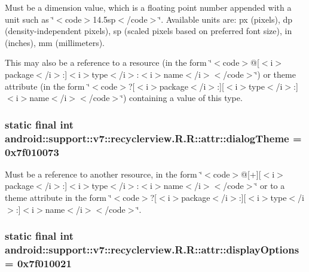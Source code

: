 Must be a dimension value, which is a floating point number appended with a unit such as \char`\"{}$<$code$>$14.5sp$<$/code$>$\char`\"{}. Available units are: px (pixels), dp (density-independent pixels), sp (scaled pixels based on preferred font size), in (inches), mm (millimeters). 

This may also be a reference to a resource (in the form \char`\"{}$<$code$>$@\mbox{[}$<$i$>$package$<$/i$>$:\mbox{]}$<$i$>$type$<$/i$>$:$<$i$>$name$<$/i$>$$<$/code$>$\char`\"{}) or theme attribute (in the form \char`\"{}$<$code$>$?\mbox{[}$<$i$>$package$<$/i$>$:\mbox{]}\mbox{[}$<$i$>$type$<$/i$>$:\mbox{]}$<$i$>$name$<$/i$>$$<$/code$>$\char`\"{}) containing a value of this type. \hypertarget{classandroid_1_1support_1_1v7_1_1recyclerview_1_1_r_1_1attr_dd7453cd22d8945f17812a8cf3ff4993}{
\subsubsection[{dialogTheme}]{\setlength{\rightskip}{0pt plus 5cm}static final int android::support::v7::recyclerview.R.R::attr::dialogTheme = 0x7f010073}}
\label{classandroid_1_1support_1_1v7_1_1recyclerview_1_1_r_1_1attr_dd7453cd22d8945f17812a8cf3ff4993}


Must be a reference to another resource, in the form \char`\"{}$<$code$>$@\mbox{[}+\mbox{]}\mbox{[}$<$i$>$package$<$/i$>$:\mbox{]}$<$i$>$type$<$/i$>$:$<$i$>$name$<$/i$>$$<$/code$>$\char`\"{} or to a theme attribute in the form \char`\"{}$<$code$>$?\mbox{[}$<$i$>$package$<$/i$>$:\mbox{]}\mbox{[}$<$i$>$type$<$/i$>$:\mbox{]}$<$i$>$name$<$/i$>$$<$/code$>$\char`\"{}. \hypertarget{classandroid_1_1support_1_1v7_1_1recyclerview_1_1_r_1_1attr_b5613b03c87764a5d5baeb0b9ea02e69}{
\subsubsection[{displayOptions}]{\setlength{\rightskip}{0pt plus 5cm}static final int android::support::v7::recyclerview.R.R::attr::displayOptions = 0x7f010021}}
\label{classandroid_1_1support_1_1v7_1_1recyclerview_1_1_r_1_1attr_b5613b03c87764a5d5baeb0b9ea02e69}


